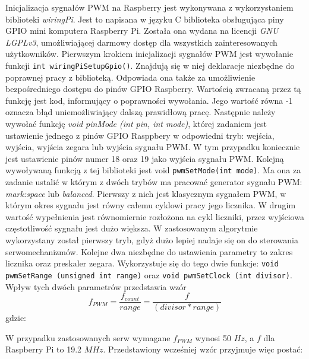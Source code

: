 Inicjalizacja sygnałów PWM na Raspberry jest wykonywana z wykorzystaniem biblioteki \textit{wiringPi}. Jest to napisana w języku C biblioteka obsługująca piny GPIO mini komputera Raspberry Pi. Została ona wydana na licencji \textit{GNU LGPLv3}, umożliwiającej darmowy dostęp dla wszystkich zainteresowanych użytkowników. Pierwszym krokiem inicjalizacji sygnałów PWM jest wywołanie funkcji \texttt{int wiringPiSetupGpio()}. Znajdują się w niej deklaracje niezbędne do poprawnej pracy z biblioteką. Odpowiada ona także za umożliwienie bezpośredniego dostępu do pinów GPIO Raspberry. Wartością zwracaną przez tą funkcję jest kod, informujący o poprawności wywołania. Jego wartość równa -1 oznacza błąd uniemożliwiający dalszą prawidłową pracę. Następnie należy wywołać funkcję \textit{void pinMode (int pin, int mode)}, której zadaniem jest ustawienie jednego z pinów GPIO Rasppbery w odpowiedni tryb: wejścia, wyjścia, wyjścia zegara lub wyjścia sygnału PWM. W tym przypadku koniecznie jest ustawienie pinów numer 18 oraz 19 jako wyjścia sygnału PWM. Kolejną wywoływaną funkcją z tej biblioteki jest void \texttt{pwmSetMode(int mode)}. Ma ona za zadanie ustalić w którym z dwóch trybów ma pracować generator sygnału PWM: \textit{mark:space} lub \textit{balanced}. Pierwszy z nich jest klasycznym sygnałem PWM, w którym okres sygnału jest równy całemu cyklowi pracy jego licznika. W drugim wartość wypełnienia jest równomiernie rozłożona na cykl liczniki, przez wyjściowa częstotliwość sygnału jest dużo większa. W zastosowanym algorytmie wykorzystany został pierwszy tryb, gdyż dużo lepiej nadaje się on do sterowania serwomechanizmów. Kolejne dwa niezbędne do ustawienia parametry to zakres licznika oraz preskaler zegara. Wykorzystuje się do tego dwie funkcje: \texttt{void pwmSetRange (unsigned int range)} oraz \texttt{void pwmSetClock (int divisor)}. Wpływ tych dwóch parametrów przedstawia wzór
\begin{equation}
f_{PWM} = \frac{f_{count}}{range} = \frac{f}{(divisor * range)}
\label{eq:hard_pwm}
\end{equation}
gdzie:
\begin{equationDescriptor}
\end{equationDescriptor}
W przypadku zastosowanych serw wymagane $f_{PWM}$ wynosi 50 $Hz$, a $f$ dla Raspberry Pi to 19.2 $MHz$. Przedstawiony wcześniej wzór przyjmuje więc postać:
